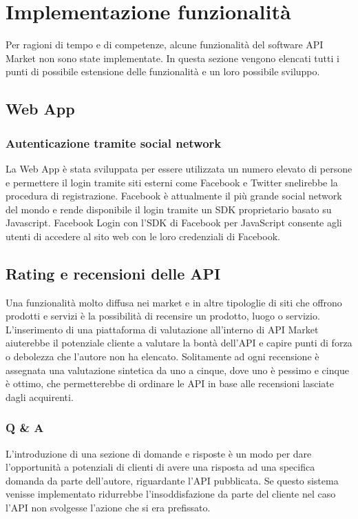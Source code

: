 \newpage
\section{Implementazione funzionalità}
Per ragioni di tempo e di competenze, alcune funzionalità del software API Market non sono
state implementate. In questa sezione vengono elencati tutti i punti di possibile estensione delle
funzionalità e un loro possibile sviluppo.

\subsection{Web App}
\subsubsection{Autenticazione tramite social network}
La Web App è stata sviluppata per essere utilizzata un numero elevato di persone e permettere il login tramite siti esterni come Facebook e Twitter snelirebbe la procedura di registrazione.
Facebook è attualmente il più grande social network del mondo e rende disponibile il login tramite un SDK proprietario basato su Javascript. Facebook Login con l'SDK di Facebook per JavaScript consente agli utenti di accedere al sito web con le loro credenziali di Facebook. 

\subsection{Rating e recensioni delle API}
Una funzionalità molto diffusa nei market e in altre tipologlie di siti che offrono prodotti e servizi è la possibilità di recensire un prodotto, luogo o servizio. L'inserimento di una piattaforma di valutazione all'interno di API Market aiuterebbe il potenziale cliente a valutare la bontà dell'API e capire punti di forza o debolezza che l'autore non ha elencato. Solitamente ad ogni recensione è assegnata una valutazione sintetica da uno a cinque, dove uno è pessimo e cinque è ottimo, che permetterebbe di ordinare le API in base alle recensioni lasciate dagli acquirenti.

\subsubsection{Q \& A}
L'introduzione di una sezione di domande e risposte è un modo per dare l'opportunità a potenziali di clienti di avere una risposta ad una specifica domanda da parte dell'autore, riguardante l'API pubblicata. Se questo sistema venisse implementato ridurrebbe l'insoddisfazione da parte del cliente nel caso l'API non svolgesse l'azione che si era prefissato.

